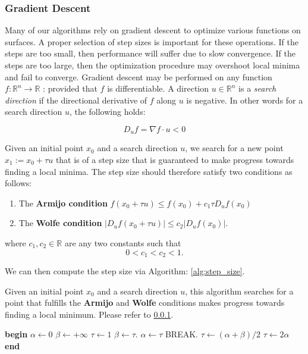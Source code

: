 \documentclass[12pt, letterpaper]{article}
\begin{document}
		\subsubsection{Gradient Descent}
		\label{section:GD}

		Many of our algorithms rely on gradient descent to optimize various functions on surfaces. A proper selection of step sizes is important for these
		operations. If the steps are too small, then performance will suffer due to slow convergence. If the steps are too large, then the optimization procedure may overshoot local minima and fail to converge.
		Gradient descent may be performed on any function $f : \mathbb{R}^{n} \rightarrow \mathbb{R}$ :  provided that $f$ is differentiable.
		A direction $u \in \mathbb{R}^{n}$ is a \emph{search direction} if the directional derivative of $f$ along $u$ is negative.
		In other words for a search direction $u$, the following holds:

		$$ D_{u}f = \nabla f \cdot u < 0$$

		Given an initial point $x_{0}$ and a search direction $u$, we search for a new point $x_{1} := x_{0} + \tau u$ that is of a step size that is guaranteed to make progress towards finding a local minima. 
		The step size should therefore satisfy two conditions as follows:

		\begin{enumerate}
		\item The \textbf{Armijo condition} $f(x_{0} + \tau u) \le f(x_{0}) + c_{1} \tau D_{u} f(x_{0})$\\
		\item The \textbf{Wolfe condition} $|D_{u}f(x_{0} + \tau u)| \le c_{2}|D_{u}f(x_{0})|.$
		\end{enumerate}

		where $c_{1}, c_{2} \in \mathbb{R}$ are any two constants such that $$0 < c_{1} < c_{2} < 1.$$

		We can then compute the step size via Algorithm: \ref{alg:step_size}.

		\begin{algorithm}
		\caption{Given an initial point $x_{0}$ and a search direction $u$, this algorithm searches for a point that fulfills the \textbf{Armijo} and \textbf{Wolfe} conditions makes progress towards finding a local
				minimum. Please refer to \ref{section:GD}.}
		\label{alg:step_size}
		\begin{algorithmic}
			\STATE \textbf{begin}
			\STATE $\alpha \leftarrow 0$
			\STATE $\beta \leftarrow +\infty$
			\STATE $\tau \leftarrow 1$
			\REPEAT
					\STATE $\beta \leftarrow \tau.$
					\STATE $\alpha \leftarrow \tau$
				\ELSE 
					\STATE BREAK.
				\ENDIF
				\IF{ $\beta < +\infty$}
					\STATE $\tau \leftarrow (\alpha + \beta)/2$
				\ELSE
					\STATE $\tau \leftarrow 2 \alpha$
				\ENDIF
			\STATE \textbf{end}

		\end{algorithmic}
		\end{algorithm}
\end{document}
